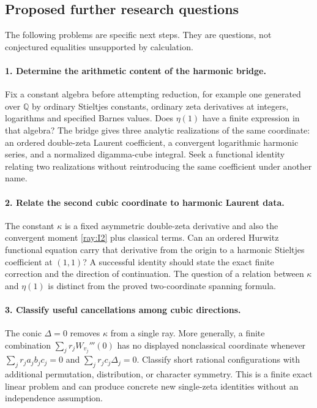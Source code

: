 \subsection{Proposed further research questions}

The following problems are specific next steps. They are questions,
not conjectured equalities unsupported by calculation.

\paragraph{1. Determine the arithmetic content of the harmonic bridge.}
Fix a constant algebra before attempting reduction, for example one
generated over $\mathbb Q$ by ordinary Stieltjes constants, ordinary
zeta derivatives at integers, logarithms and specified Barnes values.
Does $\eta(1)$ have a finite expression in that algebra? The bridge
gives three analytic realizations of the same coordinate: an ordered
double-zeta Laurent coefficient, a convergent logarithmic harmonic
series, and a normalized digamma-cube integral. Seek a functional
identity relating two realizations without reintroducing the same
coefficient under another name.

\paragraph{2. Relate the second cubic coordinate to harmonic Laurent data.}
The constant $\kappa$ is a fixed asymmetric double-zeta derivative
and also the convergent moment \eqref{ray:I2} plus classical terms.
Can an ordered Hurwitz functional equation carry that derivative
from the origin to a harmonic Stieltjes coefficient at $(1,1)$?
A successful identity should state the exact finite correction and
the direction of continuation. The question of a relation between
$\kappa$ and $\eta(1)$ is distinct from the proved two-coordinate
spanning formula.

\paragraph{3. Classify useful cancellations among cubic directions.}
The conic $\Delta=0$ removes $\kappa$ from a single ray. More
generally, a finite combination $\sum_j r_jW_{v_j}'''(0)$ has no
displayed nonclassical coordinate whenever
$\sum_jr_ja_jb_jc_j=0$ and
$\sum_jr_jc_j\Delta_j=0$. Classify short rational configurations
with additional permutation, distribution, or character symmetry.
This is a finite exact linear problem and can produce concrete new
single-zeta identities without an independence assumption.

